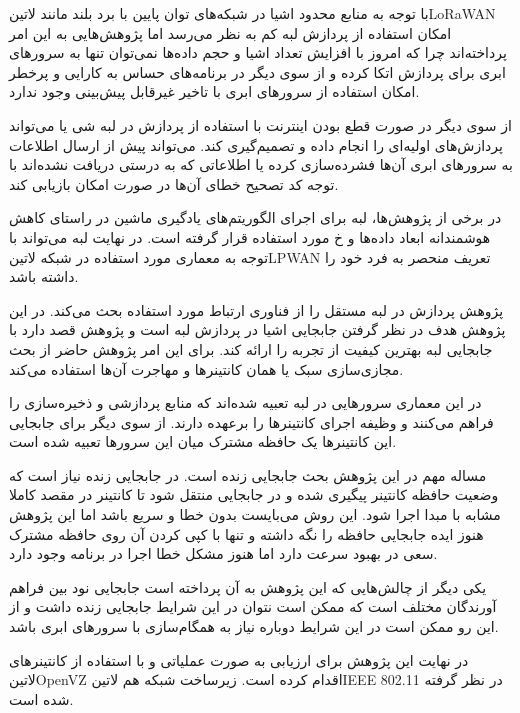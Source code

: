 
با توجه به منابع محدود اشیا در شبکه‌های توان پایین با برد بلند مانند ‌لاتین{LoRaWAN} امکان استفاده از پردازش لبه کم به نظر می‌رسد اما پژوهش‌هایی به این امر پرداخته‌اند
چرا که امروز با افزایش تعداد اشیا و حجم داده‌ها نمی‌توان تنها به سرورهای ابری برای پردازش اتکا کرده و از سوی دیگر در برنامه‌های حساس به کارایی و پرخطر امکان استفاده از سرورهای
ابری با تاخیر غیرقابل پیش‌بینی وجود ندارد.

از سوی دیگر در صورت قطع بودن اینترنت با استفاده از پردازش در لبه شی یا  می‌تواند پردازش‌های اولیه‌ای را انجام داده و تصمیم‌گیری کند.
 می‌تواند پیش از ارسال اطلاعات به سرورهای ابری آن‌ها فشرده‌سازی کرده یا اطلاعاتی که به درستی دریافت نشده‌اند با توجه کد تصحیح خطای آن‌ها
در صورت امکان بازیابی کند.

در برخی از پژوهش‌ها، لبه برای اجرای الگوریتم‌های یادگیری ماشین در راستای کاهش هوشمندانه ابعاد داده‌ها و ‌خ مورد استفاده قرار گرفته است.
در نهایت لبه می‌تواند با توجه به معماری مورد استفاده در شبکه ‌لاتین{LPWAN} تعریف منحصر به فرد خود را داشته باشد.


پژوهش  پردازش در لبه مستقل را از فناوری ارتباط مورد استفاده بحث می‌کند. در این پژوهش هدف در نظر گرفتن جابجایی اشیا در پردازش لبه است و پژوهش قصد دارد
با جابجایی لبه بهترین کیفیت از تجربه را ارائه کند. برای این امر پژوهش حاضر از بحث مجازی‌سازی سبک یا همان کانتینرها و مهاجرت آن‌ها استفاده می‌کند.

در این معماری سرورهایی در لبه تعبیه شده‌اند که منابع پردازشی و ذخیره‌سازی را فراهم می‌کنند و وظیفه اجرای کانتینرها را برعهده دارند. از سوی دیگر برای جابجایی این کانتینرها یک حافظه مشترک
میان این سرورها تعبیه شده است.

مساله مهم در این پژوهش بحث جابجایی زنده است. در جابجایی زنده نیاز است که وضعیت حافظه کانتینر پیگیری شده و در جابجایی منتقل شود تا کانتینر در مقصد کاملا مشابه با مبدا اجرا شود.
این روش می‌بایست بدون خطا و سریع باشد اما این پژوهش هنوز ایده جابجایی حافظه را نگه داشته و تنها با کپی کردن آن روی حافظه مشترک سعی در بهبود سرعت دارد اما هنوز مشکل خطا
اجرا در برنامه وجود دارد.

یکی دیگر از چالش‌هایی که این پژوهش به آن پرداخته است جابجایی نود بین فراهم آورندگان مختلف است که ممکن است نتوان در این شرایط جابجایی زنده داشت و از این رو ممکن است
در این شرایط دوباره نیاز به همگام‌سازی با سرورهای ابری باشد.

در نهایت این پژوهش برای ارزیابی به صورت عملیاتی و با استفاده از کانتینرهای ‌لاتین{OpenVZ} اقدام کرده است. زیرساخت شبکه هم ‌لاتین{IEEE 802.11} در نظر گرفته شده است.

